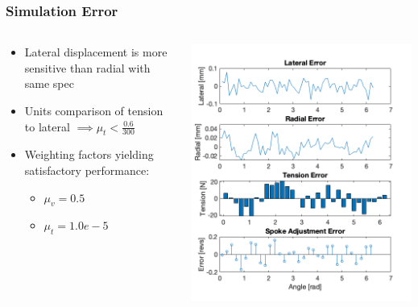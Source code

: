 \documentclass[mathserif]{beamer}
\begin{document}
\begin{frame}
\frametitle{Simulation Error}
\begin{columns}[T]
    \begin{column}[T]{5cm}
    \begin{itemize}
    \item Lateral displacement is more sensitive than radial with same spec
    \item Units comparison of tension to lateral  $\implies \mu_t < \frac{0.6}{300}$
    \item Weighting factors yielding satisfactory performance:
        \begin{itemize}
        \item $\mu_v = 0.5$
        \item $\mu_t = 1.0e-5$ 
        \end{itemize}
    \end{itemize}
    \end{column}
    \begin{column}[T]{5cm} 
        \includegraphics[width=\textwidth]{simerr}
    \end{column}
\end{columns}
\end{frame}
\end{document}
